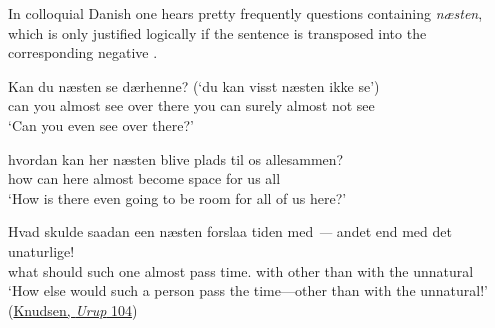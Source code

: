 In colloquial Danish one hears pretty frequently questions containing \textit{næsten}, which is only justified logically if the sentence is transposed into the corresponding negative .

\ea \label{ex:04-45}
\ea{}
\gll Kan du næsten se dærhenne? {} (`du kan visst næsten ikke se')\\
 can you almost see {over there} {} you can surely almost not see\\
\glt `Can you even see over there?' %

\ex
\gll hvordan kan her næsten blive plads til os allesammen?\\
 how can here almost become space for us all\\
\glt `How is there even going to be room for all of us here?'

\ex
\gll Hvad skulde saadan een næsten forslaa tiden med \textit{---} andet end med det unaturlige!\\
 what should such one almost pass time.\DEF{} with {} other than with the unnatural\\
\glt `How else would such a person pass the time---other than with the unnatural!'
\hfill(\href{https://archive.org/details/ordbogoverdetdan15dansuoft/page/97/mode/2up?q=\%22Hvad+skulde+saadan+een+n%C3%A6sten+forslaa+tiden\%22&view=theater}{Knudsen, \textit{Urup} 104}) %

